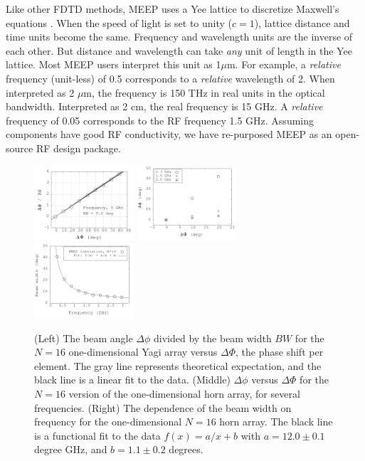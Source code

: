 \documentclass[../../main.tex]{subfiles}
\begin{document}
Like other FDTD methods, MEEP uses a Yee lattice to discretize Maxwell's equations \cite{10.1109/tap.1966.1138693}.  When the speed of light is set to unity ($c = 1$), lattice distance and time units become the same.  Frequency and wavelength units are the inverse of each other.  But distance and wavelength can take \textit{any} unit of length in the Yee lattice.  Most MEEP users interpret this unit as 1$\mu$m.  For example, a \textit{relative} frequency (unit-less) of 0.5 corresponds to a \textit{relative} wavelength of 2.  When interpreted as 2 $\mu$m, the frequency is 150 THz in real units in the optical bandwidth.  Interpreted as 2 cm, the real frequency is 15 GHz.  A \textit{relative} frequency of 0.05 corresponds to the RF frequency 1.5 GHz.  Assuming components have good RF conductivity, we have re-purposed MEEP as an open-source RF design package.  \\ \vspace{2.5mm}

\begin{figure}[ht]
\centering
\includegraphics[width=0.33\textwidth]{figures/Oct30_plot1.png}
\includegraphics[width=0.33\textwidth]{figures/Aug11_plot2.png}
\includegraphics[width=0.33\textwidth]{figures/Aug11_plot1.png}
\caption{\label{fig:pa_1} (Left) The beam angle $\Delta \phi$ divided by the beam width $BW$ for the $N = 16$ one-dimensional Yagi array versus $\Delta \Phi$, the phase shift per element. The gray line represents theoretical expectation, and the black line is a linear fit to the data.  (Middle) $\Delta \phi$ versus $\Delta \Phi$ for the $N=16$ version of the one-dimensional horn array, for several frequencies.  (Right) The dependence of the beam width on frequency for the one-dimensional $N=16$ horn array.  The black line is a functional fit to the data $f(x) = a/x + b$ with $a=12.0\pm 0.1$ degree GHz, and $b=1.1\pm 0.2$ degrees.}
\end{figure}
\end{document}
